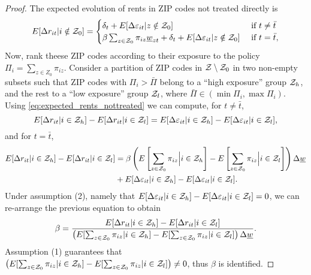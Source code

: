 \begin{proof}
    The expected evolution of rents in ZIP codes not treated directly is
    \begin{equation}\label{eq:expected_rents_nottreated}
        E[\Delta r_{it} | i\notin\mathcal{Z}_0] = 
        \begin{cases}
            \delta_t + E[\Delta \varepsilon_{it} | z\notin\mathcal{Z}_0] 
                                       & \text{ if } t\neq\bar{t} \\
            \beta\sum_{z\in\mathcal{Z}_0}\pi_{iz}\underline{w}_{zt} + \delta_t 
                     + E[\Delta \varepsilon_{it} | z\notin\mathcal{Z}_0] 
                                       & \text{ if } t=\bar{t} ,
        \end{cases}
    \end{equation}
    Now, rank theese ZIP codes according to their exposure to the policy 
    $\Pi_i = \sum_{z\in Z_0} \pi_{iz}$.
    Consider a partition of ZIP codes in $\mathcal{Z}\setminus\mathcal{Z}_0$ in 
    two non-empty subsets such that 
    ZIP codes with $\Pi_i > \bar\Pi$ belong to a ``high exposure'' group $\mathcal{Z}_h$, 
    and the rest to a ``low exposure'' group $\mathcal{Z}_l$,
    where $\bar\Pi\in\left(\min{\Pi_i}, \max{\Pi_i}\right)$.
    Using \ref{eq:expected_rents_nottreated} we can compute, for $t\neq \bar{t}$,
    \begin{equation*}
        E[\Delta r_{it} | i\in\mathcal{Z}_h] - E[\Delta r_{it} | i\in\mathcal{Z}_l] = 
        E[\Delta \varepsilon_{it} | i\in\mathcal{Z}_h] - E[\Delta \varepsilon_{it} | i\in\mathcal{Z}_l] ,
    \end{equation*}
    and for $t = \bar{t}$,
    \begin{equation*}
        \begin{split}
            E[\Delta r_{it} | i\in\mathcal{Z}_h] - E[\Delta r_{it} | i\in\mathcal{Z}_l] 
            & = \beta \left(E\left[\sum_{z\in\mathcal{Z}_0}\pi_{iz} \Big| i\in\mathcal{Z}_h\right]
                           - E\left[\sum_{z\in\mathcal{Z}_0}\pi_{iz} \Big| i\in\mathcal{Z}_l\right]\right) \Delta \underline{w}  \\
            & + E[\Delta \varepsilon_{it} | i\in\mathcal{Z}_h] - E[\Delta \varepsilon_{it} | i\in\mathcal{Z}_l] .
        \end{split}
    \end{equation*}
    Under assumption (2), namely that 
    $E[\Delta \varepsilon_{it} | i\in\mathcal{Z}_h] 
     - E[\Delta \varepsilon_{it} | i\in\mathcal{Z}_l] = 0$,
    we can re-arrange the previous equation to obtain
    \begin{equation}\label{eq:id_beta}
        \beta = \frac{E[\Delta r_{it} | i\in\mathcal{Z}_h] - E[\Delta r_{it} | i\in\mathcal{Z}_l]}
                     {\left(E[\sum_{z\in\mathcal{Z}_0}\pi_{iz} | i\in\mathcal{Z}_h] - E[\sum_{z\in\mathcal{Z}_0}\pi_{iz} | i\in\mathcal{Z}_l]\right) \Delta \underline{w}}.
    \end{equation}
    Assumption (1) guarantees that 
    $\left(E[\sum_{z\in\mathcal{Z}_0}\pi_{iz} | i\in\mathcal{Z}_h] 
          - E[\sum_{z\in\mathcal{Z}_0}\pi_{iz} | i\in\mathcal{Z}_l]\right) \neq 0$,  
    thus $\beta$ is identified.


\end{proof}
